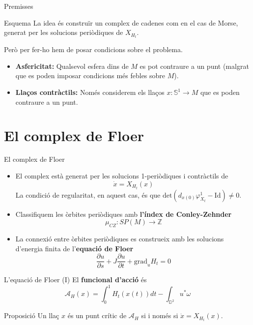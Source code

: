 \documentclass{beamer}
\newcommand{\con}[1]{\mathbb{#1}}
\begin{document}
\begin{frame}{Premisses}
	\begin{block}{Esquema}
		La idea és construïr un complex de cadenes com en el cas de Morse, generat per les solucions periòdiques de $X_{H_t}$.

		Però per fer-ho hem de posar condicions sobre el problema.
	\end{block}

	\begin{itemize}
		\item {\bf Asfericitat:} Qualsevol esfera dins de $M$ es pot contraure a un punt (malgrat que es poden imposar condicions més febles sobre $M$).
		\item {\bf Llaços contràctils:} Només considerem els llaços $x : \con{S}^1 \rightarrow M$ que es poden contraure a un punt.
	\end{itemize}
\end{frame}

\section{El complex de Floer}

\begin{frame}{El complex de Floer}
	\begin{itemize}
		\item El complex està generat per les solucions 1-periòdiques i contràctils de
		\[\dot{x} = X_{H_t}(x)\]
		La condició de regularitat, en aquest cas, és que $\mathrm{det}(d_{x(0)}\varphi_{X_t}^1 - \mathrm{Id}) \neq 0$.
		\item Classifiquem les òrbites periòdiques amb {\bf l'índex de Conley-Zehnder}
		\[\mu_{CZ} : SP(M) \longrightarrow \con{Z}\]
		\item La connexió entre òrbites periòdiques es construeix amb les solucions d'energia finita de l'{\bf equació de Floer}
		\[\frac{\partial u}{\partial s} + J \frac{\partial u}{\partial t} + \mathrm{grad}_uH_t = 0\]
	\end{itemize}
\end{frame}

\begin{frame}{L'equació de Floer (I)}
	El {\bf funcional d'acció} és
	\[\mathcal{A}_H(x) = \int_0^1 H_t(x(t)) dt - \int_{\con{D}^2} u^{\ast} \omega\]

	\begin{block}{Proposició}
		Un llaç $x$ és un punt crític de $\mathcal{A}_H$ si i només si $\dot{x} = X_{H_t}(x)$.
	\end{block}
\end{frame}
\end{document}

